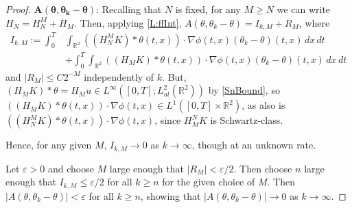 \documentclass[10pt,a4paper]{amsart}
\def\R{{\mathbb R}}
\newcommand{\abs}[1]{\left\vert#1\right\vert}
\newcommand{\eps}{\ensuremath{\varepsilon}}
\newcommand{\grad}{\ensuremath{\nabla}}
\newcommand{\iny}{\ensuremath{\infty}}
\begin{document}
\begin{proof}
    \medskip\noindent$\boldsymbol{A(\theta, \theta_k - \theta)}$:
    Recalling that $N$ is fixed, for any $M \ge N$ we can write $H_N = H_N^M + H_M$. Then, applying \cref{L:ffInt}, $A(\theta, \theta_k - \theta) = I_{k, M} + R_M$, where
    \begin{align*}
        I_{k, M}
			:= \int_0^T &\int_{\R^2} ((H_N^M K) * \theta(t, x))  \cdot \grad \phi(t,x)
                     (\theta_k - \theta)(t, x)  \, dx \, dt \\
            &+ \int_0^T \int_{\R^2} ((H_M K) * \theta(t, x))  \cdot \grad \phi(t,x)
                     (\theta_k - \theta)(t, x)  \, dx \, dt
    \end{align*}
    and $\abs{R_M} \le C 2^{-M}$ independently of $k$.
    But, $(H_M K) * \theta = H_M u \in L^{\infty}([0,T];L^2_{ul}(\R^2))$ by \cref{SnBound}, so $((H_M K) * \theta(t, x))  \cdot \grad \phi(t,x) \in L^1([0,T]\times\R^2)$, as also is $((H_N^M K) * \theta(t, x))  \cdot \grad \phi(t,x)$, since $H_M^N K$ is Schwartz-class.
    
    Hence, for any given $M$, $I_{k, M} \to 0$ as $k \to \iny$, though at an unknown rate.
    
    Let $\eps > 0$ and choose $M$ large enough that $\abs{R_M} < \eps/2$.
	Then choose $n$ large enough that $I_{k, M} \le \eps/2$ for all
	$k \ge n$ for the given choice of $M$. Then
	$\abs{A(\theta, \theta_k - \theta)} < \eps$ for all $k \ge n$,
	showing that $\abs{A(\theta, \theta_k - \theta)} \to 0$
	as $k \to \iny$. 
\end{proof}
\end{document}
